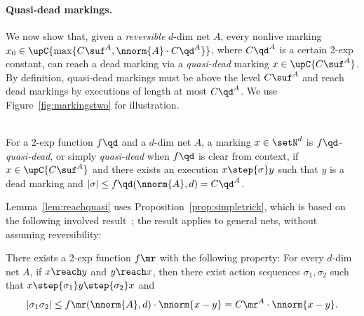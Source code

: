 \paragraph{Quasi-dead markings.}
We now show that, given a \emph{reversible} $d$-dim net $A$,
every nonlive marking $x_0\in\upC{\max\{C\suf^A,\nnorm{A}\cdot C\qd^A\}}$,
where $C\qd^A$ is a certain 2-exp constant,  can reach a dead marking via 
a  \emph{quasi-dead} marking $x\in\upC{C\suf^A}$.
By definition, quasi-dead markings must be above the level $C\suf^A$
and reach dead markings by executions
of length at most $C\qd^A$.
We use Figure~\ref{fig:markingstwo} for illustration.

\begin{defi}
\hfill\\	
For a 2-exp function $f\qd$ and a $d$-dim net $A$, a marking $x\in\setN^d$
	is \emph{$f\qd$-quasi-dead}, or simply \emph{quasi-dead} when $f\qd$
	is clear from context, if $x\in\upC{C\suf^A}$ 
and there exists an execution $x\step{\sigma}y$ such that $y$ is a dead
marking and $|\sigma|\leq
f\qd(\nnorm{A},d)=C\qd^A$.
\end{defi}

Lemma~\ref{lem:reachquasi} uses
Proposition~\ref{prop:simpletrick},
which is based on the following involved result~\cite[Theorem
2]{DBLP:conf/fsttcs/Leroux19}; 
 the result applies to general nets,
without assuming reversibility:
\begin{lemC}\label{lem:fmr}
	There exists a 2-exp function $f\mr$
	with the following property:
	For every $d$-dim net $A$, if $x\reach y$ and $y\reach x$, then
there exist action
	sequences $\sigma_1,\sigma_2$ such that 
	$x\step{\sigma_1}y\step{\sigma_2}x$ and
	\begin{equation*}
		|\sigma_1\sigma_2|\leq
		f\mr(\nnorm{A},d)\cdot\nnorm{x-y}=
		C\mr^A\cdot\nnorm{x-y}.
	\end{equation*}		
\end{lemC}

